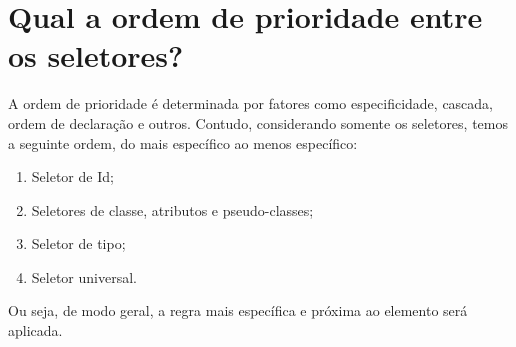 \section{Qual a ordem de prioridade entre os seletores?}
A ordem de prioridade é determinada por fatores como especificidade, cascada, ordem de declaração e outros. Contudo, considerando somente os seletores, temos a seguinte ordem, do mais específico ao menos específico:
\begin{enumerate}
  \item Seletor de Id;
  \item Seletores de classe, atributos e pseudo-classes;
  \item Seletor de tipo;
  \item Seletor universal.
\end{enumerate}

Ou seja, de modo geral, a regra mais específica e próxima ao elemento será aplicada.
